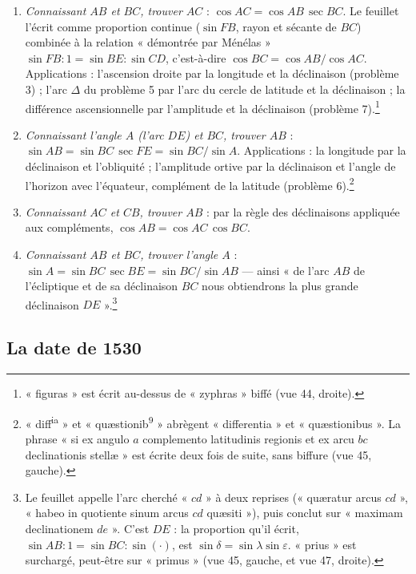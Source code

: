 \documentclass[11pt,a4paper]{article}
\begin{document}
\begin{enumerate}
  \item[1.] \emph{Connaissant $AB$ et $BC$, trouver $AC$} :
    $\cos AC = \cos AB\,\sec BC$. Le feuillet l'écrit comme proportion continue
    ($\sin FB$, rayon et sécante de $BC$) combinée à la relation « démontrée par
    Ménélas » $\sin FB : 1 = \sin BE : \sin CD$, c'est-à-dire
    $\cos BC = \cos AB/\cos AC$. Applications : l'ascension droite par la
    longitude et la déclinaison (problème 3) ; l'arc $\Delta$ du problème 5 par
    l'arc du cercle de latitude et la déclinaison ; la différence ascensionnelle
    par l'amplitude et la déclinaison (problème 7).\footnote{« figuras » est
    écrit au-dessus de « zyphras » biffé (vue 44, droite).}
  \item[2.] \emph{Connaissant l'angle $A$ (l'arc $DE$) et $BC$, trouver $AB$} :
    $\sin AB = \sin BC\,\sec FE = \sin BC/\sin A$. Applications : la longitude
    par la déclinaison et l'obliquité ; l'amplitude ortive par la déclinaison et
    l'angle de l'horizon avec l'équateur, complément de la latitude
    (problème 6).\footnote{« diff\textsuperscript{ia} » et
    « quæstionib\textsuperscript{9} » abrègent « differentia » et
    « quæstionibus ». La phrase « si ex angulo $a$ complemento latitudinis
    regionis et ex arcu $bc$ declinationis stellæ » est écrite deux fois de
    suite, sans biffure (vue 45, gauche).}
  \item[3.] \emph{Connaissant $AC$ et $CB$, trouver $AB$} : par la règle des
    déclinaisons appliquée aux compléments, $\cos AB = \cos AC\,\cos BC$.
  \item[4.] \emph{Connaissant $AB$ et $BC$, trouver l'angle $A$} :
    $\sin A = \sin BC\,\sec BE = \sin BC/\sin AB$ — ainsi « de l'arc $AB$ de
    l'écliptique et de sa déclinaison $BC$ nous obtiendrons la plus grande
    déclinaison $DE$ ».\footnote{Le feuillet appelle l'arc cherché « $cd$ » à deux
    reprises (« quæratur arcus $cd$ », « habeo in quotiente sinum arcus $cd$
    quæsiti »), puis conclut sur « maximam declinationem $de$ ». C'est $DE$ :
    la proportion qu'il écrit, $\sin AB : 1 = \sin BC : \sin(\cdot)$, est
    $\sin\delta = \sin\lambda\sin\varepsilon$. « prius » est surchargé, peut-être
    sur « primus » (vue 45, gauche, et vue 47, droite).}
\end{enumerate}

\subsection*{La date de 1530}
\end{document}
